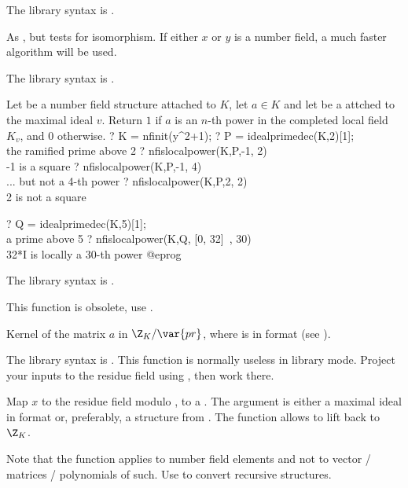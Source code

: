 The library syntax is .

\label{se:nfisisom}
As , but tests for isomorphism. If either $x$ or $y$ is a
number field, a much faster algorithm will be used.

The library syntax is .

\label{se:nfislocalpower}
Let  be a number field structure attached to $K$,
let $a \in K$ and let  be a  attched to the
maximal ideal $v$. Return $1$ if $a$ is an $n$-th power in the completed
local field $K_v$, and $0$ otherwise.
\bprog
? K = nfinit(y^2+1);
? P = idealprimedec(K,2)[1]; \\ the ramified prime above 2
? nfislocalpower(K,P,-1, 2) \\ -1 is a square
? nfislocalpower(K,P,-1, 4) \\ ... but not a 4-th power
? nfislocalpower(K,P,2, 2)  \\ 2 is not a square

? Q = idealprimedec(K,5)[1]; \\ a prime above 5
? nfislocalpower(K,Q, [0, 32]~, 30)  \\ 32*I is locally a 30-th power
@eprog

The library syntax is .

\label{se:nfkermodpr}
This function is obsolete, use .

Kernel of the matrix $a$ in $\Z_K/\var{pr}$, where  is in
 format (see ).

The library syntax is .
This function is normally useless in library mode. Project your
inputs to the residue field using , then work there.

\label{se:nfmodpr}
Map $x$ to the residue field modulo , to a .
The argument  is either a maximal ideal in 
format or, preferably, a  structure from . The
function  allows to lift back to $\Z_K$.

Note that the function applies to number field elements and not to
vector / matrices / polynomials of such. Use  to convert
recursive structures.

